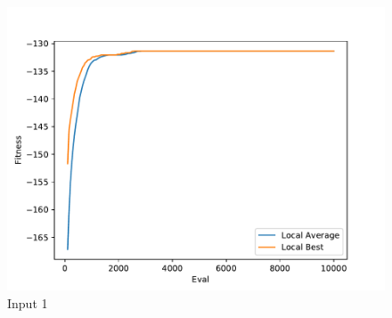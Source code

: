 \documentclass{standalone}
\begin{document}
\begin{figure}[!htb]
	\caption{Input 1}
	\label{fig:graph_1069}
	\includegraphics[width=\textwidth]{../graphs/graphs/1069.pdf}
\end{figure}
\end{document}
